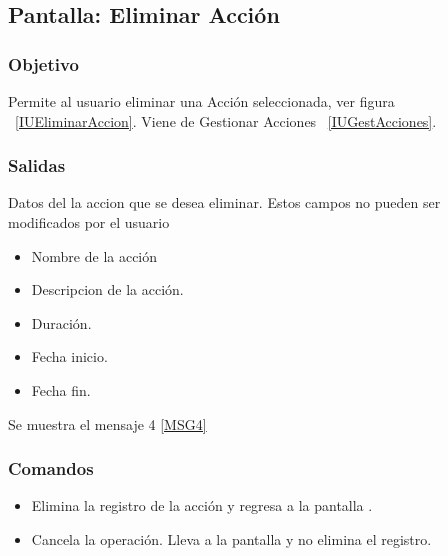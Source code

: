 \subsection{Pantalla: Eliminar Acción}

\subsubsection{Objetivo}
Permite al usuario eliminar una Acción seleccionada, ver figura ~\ref{IUEliminarAccion}. Viene de Gestionar Acciones ~\ref{IUGestAcciones}.


\subsubsection{Salidas}
  Datos del la accion  que se desea eliminar. Estos campos no pueden ser modificados por el usuario
\begin{itemize}
 \item Nombre de la acción
 \item Descripcion de la acción.
 \item Duración.
 \item Fecha inicio.
 \item Fecha fin.

\end{itemize}
Se muestra el mensaje 4 \ref{MSG4}

\subsubsection{Comandos}
\begin{itemize}
 \item {} Elimina la  registro de la acción y regresa a la pantalla .
 \item {} Cancela la operación. Lleva a la pantalla  y no elimina el registro.
\end{itemize}

